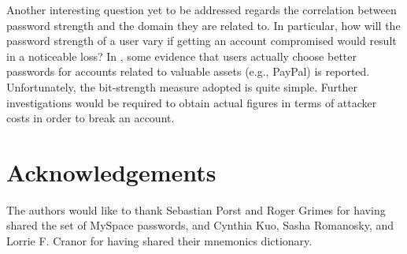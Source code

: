 \documentclass[a4paper,twocolumn]{article}
\begin{document}
Another interesting question yet to be addressed regards the correlation
between password strength and the domain they are related to. In particular,
how will the password strength of a user vary if getting an account
compromised would result in a noticeable loss? In \cite{Florencio2007Largescale},
some evidence that users actually choose better passwords for accounts
related to valuable assets (e.g., PayPal) is reported. Unfortunately,
the bit-strength measure adopted is quite simple. Further investigations
would be required to obtain actual figures in terms of attacker costs
in order to break an account.


\section{Acknowledgements}

The authors would like to thank Sebastian Porst and Roger Grimes for
having shared the set of MySpace passwords, and Cynthia Kuo, Sasha
Romanosky, and Lorrie F. Cranor for having shared their mnemonics
dictionary.



\end{document}
